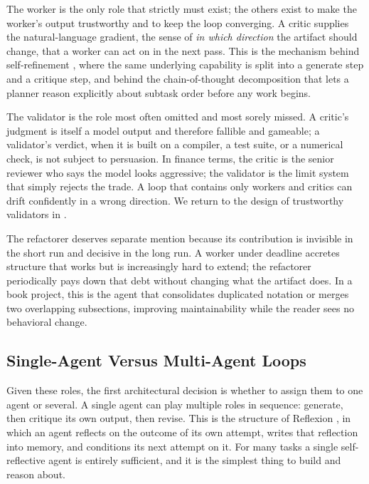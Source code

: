 The worker is the only role that strictly must exist; the others exist to make the worker's output trustworthy and to keep the loop converging. A critic supplies the natural-language gradient, the sense of \emph{in which direction} the artifact should change, that a worker can act on in the next pass. This is the mechanism behind self-refinement \cite{madaan2023selfrefine}, where the same underlying capability is split into a generate step and a critique step, and behind the chain-of-thought decomposition \cite{wei2022chain} that lets a planner reason explicitly about subtask order before any work begins.

The validator is the role most often omitted and most sorely missed. A critic's judgment is itself a model output and therefore fallible and gameable; a validator's verdict, when it is built on a compiler, a test suite, or a numerical check, is not subject to persuasion. In finance terms, the critic is the senior reviewer who says the model looks aggressive; the validator is the limit system that simply rejects the trade. A loop that contains only workers and critics can drift confidently in a wrong direction. We return to the design of trustworthy validators in .

The refactorer deserves separate mention because its contribution is invisible in the short run and decisive in the long run. A worker under deadline accretes structure that works but is increasingly hard to extend; the refactorer periodically pays down that debt without changing what the artifact does. In a book project, this is the agent that consolidates duplicated notation or merges two overlapping subsections, improving maintainability while the reader sees no behavioral change.

\subsection{Single-Agent Versus Multi-Agent Loops}\label{subsec:single-vs-multi-agent}

Given these roles, the first architectural decision is whether to assign them to one agent or several. A single agent can play multiple roles in sequence: generate, then critique its own output, then revise. This is the structure of Reflexion \cite{shinn2023reflexion}, in which an agent reflects on the outcome of its own attempt, writes that reflection into memory, and conditions its next attempt on it. For many tasks a single self-reflective agent is entirely sufficient, and it is the simplest thing to build and reason about.


